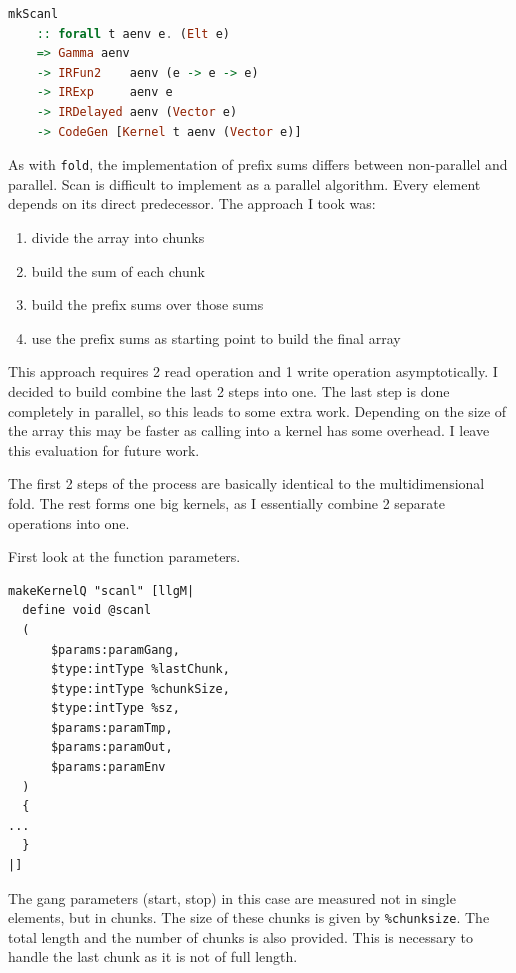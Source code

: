 \documentclass[a4paper,bibliography=totocnumbered,parskip,headsepline]{scrbook}
\begin{document}
\begin{lstlisting}[language=haskell]
mkScanl
    :: forall t aenv e. (Elt e)
    => Gamma aenv
    -> IRFun2    aenv (e -> e -> e)
    -> IRExp     aenv e
    -> IRDelayed aenv (Vector e)
    -> CodeGen [Kernel t aenv (Vector e)]
\end{lstlisting}

As with \lstinline[language=haskell]!fold!, the implementation of prefix sums differs between non-parallel and parallel.
Scan is difficult to implement as a parallel algorithm.
Every element depends on its direct predecessor.
The approach I took was:

\begin{enumerate}[noitemsep]
\item divide the array into chunks
\item build the sum of each chunk
\item build the prefix sums over those sums
\item use the prefix sums as starting point to build the final array
\end{enumerate}

This approach requires 2 read operation and 1 write operation asymptotically.
I decided to build combine the last 2 steps into one.
The last step is done completely in parallel, so this leads to some extra work.
Depending on the size of the array this may be faster as calling into a kernel has some overhead.
I leave this evaluation for future work.

The first 2 steps of the process are basically identical to the multidimensional fold.
The rest forms one big kernels, as I essentially combine 2 separate operations into one.

First look at the function parameters.
\begin{lstlisting}
makeKernelQ "scanl" [llgM|
  define void @scanl
  (
      $params:paramGang,
      $type:intType %lastChunk,
      $type:intType %chunkSize,
      $type:intType %sz,
      $params:paramTmp,
      $params:paramOut,
      $params:paramEnv
  )
  {
...
  }
|]
\end{lstlisting}
\begin{minipage}{\textwidth}
The gang parameters (start, stop) in this case are measured not in single elements, but in chunks.
The size of these chunks is given by \lstinline{%chunksize}.
The total length and the number of chunks is also provided.
This is necessary to handle the last chunk as it is not of full length.
\end{minipage}
\end{document}
